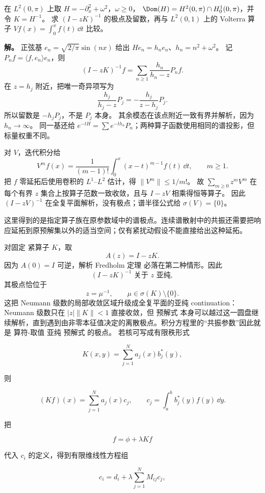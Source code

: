 \begin{exbox}
在 $L^2(0,\pi)$ 上取 $H=-\partial_x^2+\omega^2$，$\omega\ge0$，
$\Dom(H)=H^2(0,\pi)\cap H_0^1(0,\pi)$，并令 $K=H^{-1}$。
求 $(I-zK)^{-1}$ 的极点及留数，再与 $L^2(0,1)$ 上的 Volterra 算子 $Vf(x)=\int_0^xf(t)\,\dd t$ 比较。

\textbf{解。} 正弦基 $e_n=\sqrt{2/\pi}\sin(nx)$ 给出 $He_n=h_ne_n$、$h_n=n^2+\omega^2$。
记 $P_n f=\langle f,e_n\rangle e_n$，则
\[
(I-zK)^{-1}f=\sum_{n\ge1}\frac{h_n}{h_n-z}P_nf.
\]
在 $z=h_j$ 附近，把唯一奇异项写为
\[
\frac{h_j}{h_j-z}P_j=-\frac{h_j}{z-h_j}P_j.
\]
所以留数是 $-h_jP_j$，不是 $P_j$ 本身。
其余模态在该点附近一致有界并解析，因为 $h_n\to\infty$。
同一基还给 $e^{-tH}=\sum e^{-th_n}P_n$；两种算子函数使用相同的谱投影，但标量权重不同。

对 $V$，迭代积分给
\[
V^mf(x)=\frac1{(m-1)!}\int_0^x(x-t)^{m-1}f(t)\,\dd t,
\qquad m\ge1.
\]
把 $f$ 零延拓后使用卷积的 $L^1$–$L^2$ 估计，得 $\|V^m\|\le1/m!$。
故 $\sum_{m\ge0}z^mV^m$ 在每个有界 $z$ 集合上按算子范数一致收敛，且与 $I-zV$ 相乘得恒等算子。
因此 $(I-zV)^{-1}$ 在全复平面解析，没有极点；谱半径公式给 $\sigma(V)=\{0\}$。
\end{exbox}

这里得到的是指定算子族在原参数域中的谱极点。连续谱散射中的共振还需要把响应延拓到原预解集以外的适当空间；仅有紧扰动假设不能直接给出这种延拓。

对固定 紧算子 $K$，取
\[
A(z)=I-zK.
\]
因为 $A(0)=I$ 可逆，解析 Fredholm 定理 必落在第二种情形。因此
\begin{equation*}\boxed{
(I-zK)^{-1}
\text{ 关于 }z\text{ 亚纯},
}\end{equation*}
其极点恰位于
\[
z=\mu^{-1},
\qquad
\mu\in\sigma(K)\setminus\{0\}.
\]
这把 Neumann 级数的局部收敛区域升级成全复平面的亚纯 continuation：Neumann 级数只在 $|z|\|K\|<1$ 直接收敛，但 预解式 本身可以越过这一圆盘继续解析，直到遇到由非零本征值决定的离散极点。积分方程里的“共振参数”因此就是 算符-取值 亚纯 预解式 的极点。
若核可写成有限秩形式

\[
K(x,y)=\sum_{j=1}^N a_j(x)b_j^*(y),
\]

则

\[
(Kf)(x)=\sum_{j=1}^N a_j(x)c_j,
\qquad
c_j=\int_a^b b_j^*(y)f(y)\,\dd y.
\]

把

\[
f=\phi+\lambda Kf
\]

代入 $c_i$ 的定义，得到有限维线性方程组

\[
c_i=d_i+\lambda\sum_{j=1}^N M_{ij}c_j,
\]

